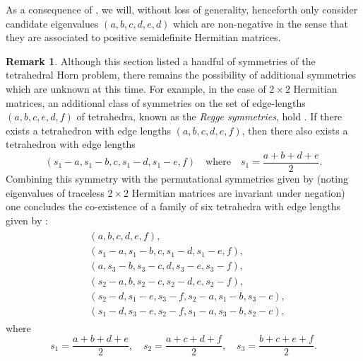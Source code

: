 \documentclass[notitlepage, 11pt, letterpaper]{amsart}
\theoremstyle{plain}
\theoremstyle{definition}
\newtheorem{rem}[thm]{Remark}%
\let\cref\crtcref
\newcommand{\ea}{a}
\newcommand{\eb}{b}
\newcommand{\ec}{c}
\newcommand{\ed}{d}
\newcommand{\ee}{e}
\begin{document}
As a consequence of \cref{cor:psd}, we will, without loss of generality, henceforth only consider candidate eigenvalues $(\ea,\eb,\ec,\ed,\ee,\ed)$ which are non-negative in the sense that they are associated to positive semidefinite Hermitian matrices.
\begin{rem}
    Although this section listed a handful of symmetries of the tetrahedral Horn problem, there remains the possibility of additional symmetries which are unknown at this time.
    For example, in the case of $2\times 2$ Hermitian matrices, an additional class of symmetries on the set of edge-lengths $(a,b,c,e,d,f)$ of tetrahedra, known as the \textit{Regge symmetries}, hold \cite{akopyan2019regge,boalch2007regge,ponzano1968semiclassical}.
    If there exists a tetrahedron with edge lengths $(a,b,c,d,e,f)$, then there also exists a tetrahedron with edge lengths
    \begin{equation}
        (s_1-a,s_1-b,c,s_1-d,s_1-e,f) \quad \text{where} \quad s_1 = \frac{a+b+d+e}{2}.
    \end{equation}
    Combining this symmetry with the permutational symmetries given by \cref{prop:tet_symmetry} (noting eigenvalues of traceless $2 \times 2$ Hermitian matrices are invariant under negation) one concludes the co-existence of a family of six tetrahedra with edge lengths given by \cite[Chapter 9]{varshalovich1988quantum}:
    \begin{align}
        \begin{split}
            &(a,b,c,d,e,f), \\
            &(s_1-a,s_1-b,c,s_1-d,s_1-e,f), \\
            &(a,s_3-b,s_3-c,d,s_3-e,s_3-f), \\
            &(s_2-a,b,s_2-c,s_2-d,e,s_2-f), \\
            &(s_2-d,s_1-e,s_3-f,s_2-a,s_1-b,s_3-c), \\
            &(s_1-d,s_3-e,s_2-f,s_1-a,s_3-b,s_2-c),
        \end{split}
    \end{align}
    where
    \begin{equation}
        s_1 = \frac{a+b+d+e}{2}, \quad
        s_2 = \frac{a+c+d+f}{2}, \quad
        s_3 = \frac{b+c+e+f}{2}.
    \end{equation}
\end{rem}
\end{document}
